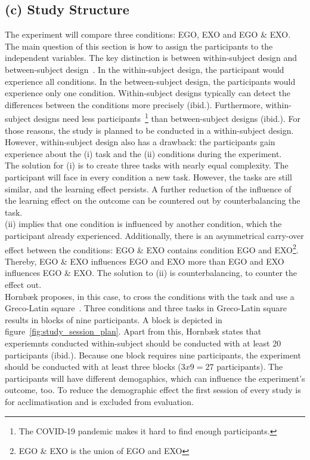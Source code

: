 \subsection{(c) Study Structure}
\label{sec:studyStructure}
The experiment will compare three conditions: EGO, EXO and EGO \& EXO. The main question of this section is how to assign the participants to the independent variables. The key distinction is between within-subject design and between-subject design~\cite{hornbaek}. In the within-subject design, the participant would experience all conditions. In the between-subject design, the participants would experience only one condition. Within-subject designs typically can detect the differences between the conditions more precisely (ibid.). Furthermore, within-subject designs need less participants~\footnote{The COVID-19 pandemic makes it hard to find enough participants.} than between-subject designs (ibid.). For those reasons, the study is planned to be conducted in a within-subject design.\\
However, within-subject design also has a drawback: the participants gain experience about the (i) task and the (ii) conditions during the experiment.\\

The solution for (i) is to create three tasks with nearly equal complexity. The participant will face in every condition a new task. However, the tasks are still similar, and the learning effect persists. A further reduction of the influence of the learning effect on the outcome can be countered out by counterbalancing the task.\\

(ii) implies that one condition is influenced by another condition, which the participant already experienced. Additionally, there is an asymmetrical carry-over effect between the conditions: EGO \& EXO contains condition EGO and EXO\footnote{EGO \& EXO is the union of EGO and EXO}. Thereby, EGO \& EXO influences EGO and EXO more than EGO and EXO influences EGO \& EXO. The solution to (ii) is counterbalancing, to counter the effect out.\\

Hornb\ae{}k proposes, in this case, to cross the conditions with the task and use a Greco-Latin square~\cite{hornbaek}. Three conditions and three tasks in Greco-Latin square results in blocks of nine participants. A block is depicted in figure~\ref{fig:study_session_plan}. Apart from this, Hornb\ae{}k states that experiemnts conducted within-subject should be conducted with at least 20 participants (ibid.). Because one block requires nine participants, the experiment should be conducted with at least three blocks ($3x9=27$ participants). 
The participants will have different demogaphics, which can influence the experiment's outcome, too. To reduce the demographic effect the first session of every study is for acclimatisation and is excluded from evaluation.


